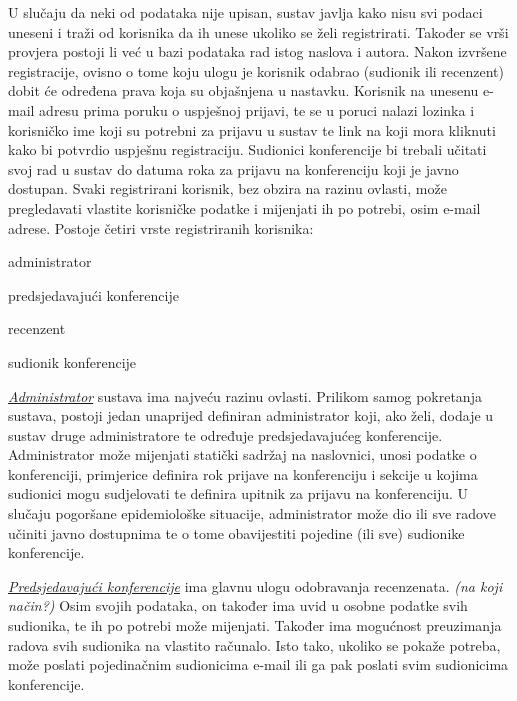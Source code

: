 		U slučaju da neki od podataka nije upisan, sustav javlja kako nisu svi podaci uneseni i traži od korisnika da ih unese ukoliko se želi registrirati. Također se vrši provjera postoji li već u bazi podataka rad istog naslova i autora. Nakon izvršene registracije, ovisno o tome koju ulogu je korisnik odabrao (sudionik ili recenzent) dobit će određena prava koja su objašnjena u nastavku. Korisnik na unesenu e-mail adresu prima poruku o uspješnoj prijavi, te se u poruci nalazi lozinka i korisničko ime koji su potrebni za prijavu u sustav te link na koji mora kliknuti kako bi potvrdio uspješnu registraciju. Sudionici konferencije bi trebali učitati svoj rad u sustav do datuma roka za prijavu na konferenciju koji je javno dostupan.
		\newline
		\newline
		Svaki registrirani korisnik, bez obzira na razinu ovlasti, može pregledavati vlastite korisničke podatke i mijenjati ih po potrebi, osim e-mail adrese. 
		\newline
		\newline
		Postoje četiri vrste registriranih korisnika:
		
		\begin{packed_item}
			
			\item administrator
			\item predsjedavajući konferencije
			\item recenzent
			\item sudionik konferencije
			
		\end{packed_item}
	
		\underline{\textit{Administrator}} sustava ima najveću razinu ovlasti. Prilikom samog pokretanja sustava, postoji jedan unaprijed definiran administrator koji, ako želi, dodaje u sustav druge administratore te određuje predsjedavajućeg konferencije. Administrator može mijenjati statički sadržaj na naslovnici, unosi podatke o konferenciji, primjerice definira rok prijave na konferenciju i sekcije u kojima sudionici mogu sudjelovati te definira upitnik za prijavu na konferenciju. U slučaju pogoršane epidemiološke situacije, administrator može dio ili sve radove učiniti javno dostupnima te o tome obavijestiti pojedine (ili sve) sudionike konferencije.
		
		
		\underline{\textit{Predsjedavajući konferencije}} ima glavnu ulogu odobravanja recenzenata. \textit{(na koji način?)} Osim svojih podataka, on također ima uvid u osobne podatke svih sudionika, te ih po potrebi može mijenjati. Također ima mogućnost preuzimanja radova svih sudionika na vlastito računalo. Isto tako, ukoliko se pokaže potreba, može poslati pojedinačnim sudionicima e-mail ili ga pak poslati svim sudionicima konferencije. 
		
